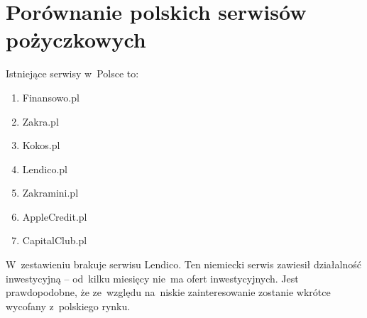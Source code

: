 \documentclass[a4paper,twoside,titlepage,openright]{book}
\begin{document}
\section{Porównanie polskich serwisów pożyczkowych}

Istniejące serwisy w~Polsce to:

\begin{enumerate}

	\item Finansowo.pl \cite{finansowoPl}
	\item Zakra.pl \cite{zakraPl}
	\item Kokos.pl \cite{kokosPl}
	\item Lendico.pl \cite{lendicoPl}
	\item Zakramini.pl \cite{zakraminiPl}
	\item AppleCredit.pl \cite{applecreditPl}
	\item CapitalClub.pl \cite{capitalclubPl}

\end{enumerate}

\begin{small}
\noindent
{}
\end{small}

W~zestawieniu brakuje serwisu Lendico. Ten niemiecki serwis zawiesił działalność inwestycyjną -- od~kilku miesięcy nie~ma ofert inwestycyjnych. Jest prawdopodobne, że ze~względu na~niskie zainteresowanie zostanie wkrótce wycofany z~polskiego rynku.
\end{document}
